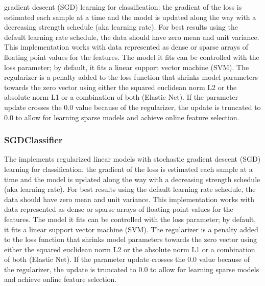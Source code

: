  gradient descent (SGD) learning for classification: the gradient of the loss is estimated each
 sample at                         a time and the model is updated along the way with a decreasing
 strength schedule                         (aka learning rate). For best results using the default
 learning rate schedule, the                         data should have zero mean and unit variance.
 This implementation works with data represented as dense or sparse arrays of floating
 point values for the features. The model it fits can be controlled with the loss parameter;
 by default, it fits a linear support vector machine (SVM).                         The regularizer
 is a penalty added to the loss function that shrinks model parameters towards
 the zero vector using either the squared euclidean norm L2 or the absolute norm L1 or a
 combination of both (Elastic Net). If the parameter update crosses the 0.0 value because
 of the regularizer, the update is truncated to $0.0$ to allow for learning sparse models and
 achieve online feature selection.                         

\subsubsection{SGDClassifier}
  The  implements regularized linear models with stochastic
  gradient descent (SGD) learning for classification: the gradient of the loss is estimated each
  sample at                         a time and the model is updated along the way with a decreasing
  strength schedule                         (aka learning rate). For best results using the default
  learning rate schedule, the                         data should have zero mean and unit variance.
  This implementation works with data represented as dense or sparse arrays of floating
  point values for the features. The model it fits can be controlled with the loss parameter;
  by default, it fits a linear support vector machine (SVM).                         The regularizer
  is a penalty added to the loss function that shrinks model parameters towards
  the zero vector using either the squared euclidean norm L2 or the absolute norm L1 or a
  combination of both (Elastic Net). If the parameter update crosses the 0.0 value because
  of the regularizer, the update is truncated to $0.0$ to allow for learning sparse models and
  achieve online feature selection.                         


